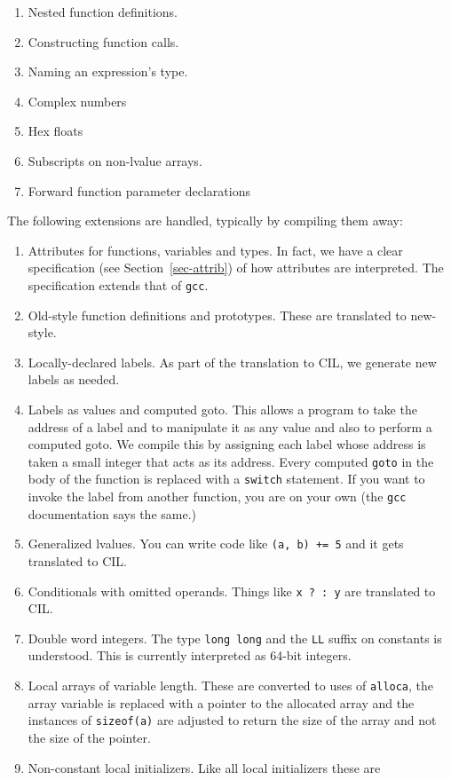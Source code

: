 \documentclass{article}
\def\secref#1{Section~\ref{sec-#1}}
\def\t#1{{\tt #1}}
\begin{document}
\begin{enumerate}
\item Nested function definitions.
\item Constructing function calls.
\item Naming an expression's type.
\item Complex numbers
\item Hex floats
\item Subscripts on non-lvalue arrays.
\item Forward function parameter declarations
\end{enumerate}

 The following extensions are handled, typically by compiling them away:
\begin{enumerate}
\item Attributes for functions, variables and types. In fact, we have a clear
specification (see \secref{attrib}) of how attributes are interpreted. The
specification extends that of \t{gcc}.
\item Old-style function definitions and prototypes. These are translated to
new-style. 
\item Locally-declared labels. As part of the translation to CIL, we generate
new labels as needed. 
\item Labels as values and computed goto. This allows a program to take the
address of a label and to manipulate it as any value and also to perform a
computed goto. We compile this by assigning each label whose address is taken
a small integer that acts as its address. Every computed \t{goto} in the body
of the function is replaced with a \t{switch} statement. If you want to invoke
the label from another function, you are on your own (the \t{gcc}
documentation says the same.)
\item Generalized lvalues. You can write code like \t{(a, b) += 5} and it gets
translated to CIL. 
\item Conditionals with omitted operands. Things like \t{x ? : y} are
translated to CIL.
\item Double word integers. The type \t{long long} and the \t{LL} suffix on
constants is understood. This is currently interpreted as 64-bit integers.
\item Local arrays of variable length. These are converted to uses of
\t{alloca}, the array variable is replaced with a pointer to the allocated
array and the instances of \t{sizeof(a)} are adjusted to return the size of
the array and not the size of the pointer. 
\item Non-constant local initializers. Like all local initializers these are

\end{enumerate}
\end{document}
